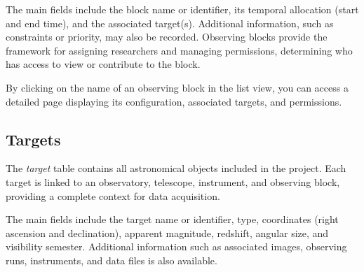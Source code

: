 The main fields include the block name or identifier, its temporal allocation (start and end time), and the associated target(s). Additional information, such as constraints or priority, may also be recorded. Observing blocks provide the framework for assigning researchers and managing permissions, determining who has access to view or contribute to the block.


By clicking on the name of an observing block in the list view, you can access a detailed page displaying its configuration, associated targets, and permissions.

\subsection{Targets}

The \textsl{target} table contains all astronomical objects included in the project. Each target is linked to an observatory, telescope, instrument, and observing block, providing a complete context for data acquisition.

The main fields include the target name or identifier, type, coordinates (right ascension and declination), apparent magnitude, redshift, angular size, and visibility semester. Additional information such as associated images, observing runs, instruments, and data files is also available.


